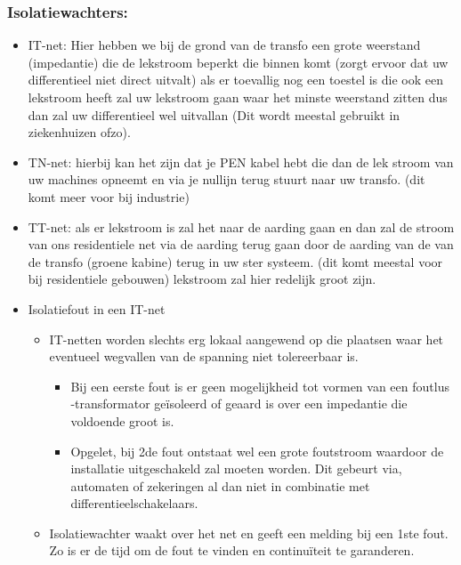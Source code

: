 \documentclass[12pt]{article}
\begin{document}
\subsubsection{Isolatiewachters:}
\begin{itemize}
    \item IT-net: Hier hebben we bij de grond van de transfo een grote weerstand (impedantie) die de lekstroom beperkt die binnen komt (zorgt ervoor dat uw differentieel niet direct uitvalt) als er toevallig nog een toestel is die ook een lekstroom heeft zal uw lekstroom gaan waar het minste weerstand zitten dus dan zal uw differentieel wel uitvallan (Dit wordt meestal gebruikt in ziekenhuizen ofzo).
    \item TN-net: hierbij kan het zijn dat je PEN kabel hebt die dan de lek stroom van uw machines opneemt en via je nullijn terug stuurt naar uw transfo. (dit komt meer voor bij industrie)
    \item TT-net: als er lekstroom is zal het naar de aarding gaan en dan zal de stroom van ons residentiele net via de aarding terug gaan door de aarding van de van de transfo (groene kabine) terug in uw ster systeem. (dit komt meestal voor bij residentiele gebouwen) lekstroom zal hier redelijk groot zijn.
\end{itemize}
\begin{itemize}
    \item Isolatiefout in een IT-net\begin{itemize}
        \item IT-netten worden slechts erg lokaal aangewend op die plaatsen waar het eventueel wegvallen van de spanning niet tolereerbaar is.\begin{itemize}
            \item Bij een eerste fout is er geen mogelijkheid tot vormen van een foutlus -transformator geïsoleerd of geaard is over een impedantie die voldoende groot is.
            \item Opgelet, bij 2de fout ontstaat wel een grote foutstroom waardoor de installatie uitgeschakeld zal moeten worden. Dit gebeurt via, automaten of zekeringen al dan niet in combinatie met differentieelschakelaars.
        \end{itemize}
        \item Isolatiewachter waakt over het net en geeft een melding bij een 1ste fout. Zo is er de tijd om de fout te vinden en continuïteit te garanderen.
    \end{itemize}
\end{itemize}
\end{document}
